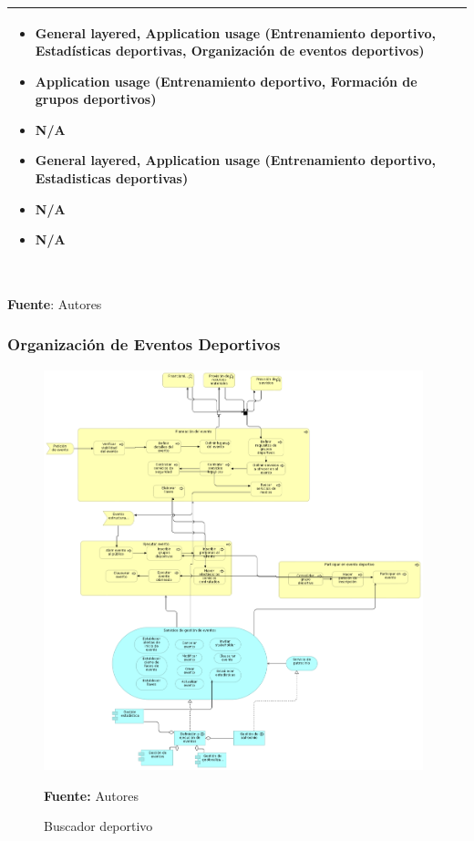 \begin{table}[!htb]
\begin{center}
{\begin{tabular}{|p{7cm}|p{4cm}|}
\begin{itemize}
				\item General layered, Application usage (Entrenamiento deportivo, Estadísticas deportivas, Organización de eventos deportivos)
				\item Application usage (Entrenamiento deportivo, Formación de grupos deportivos)
				\item N/A
				\item General layered, Application usage (Entrenamiento deportivo, Estadisticas deportivas)
				\item N/A
				\item N/A
			\end{itemize} 
			\\
			\hline
		\end{tabular}
		} \\
		\textbf{Fuente}: Autores
	\end{center}
\end{table}

\subsubsection{Organización de Eventos Deportivos}

\begin{figure}[!htb]
  \begin{center}
    \includegraphics[width=11cm]{./imagenes/application_usage/organizacioneventosdeportivos.png}
    \caption{Buscador deportivo}
    \label{fig:BF_BuscadorDeportivo}
    \textbf{Fuente:}  Autores
  \end{center}
\end{figure}

